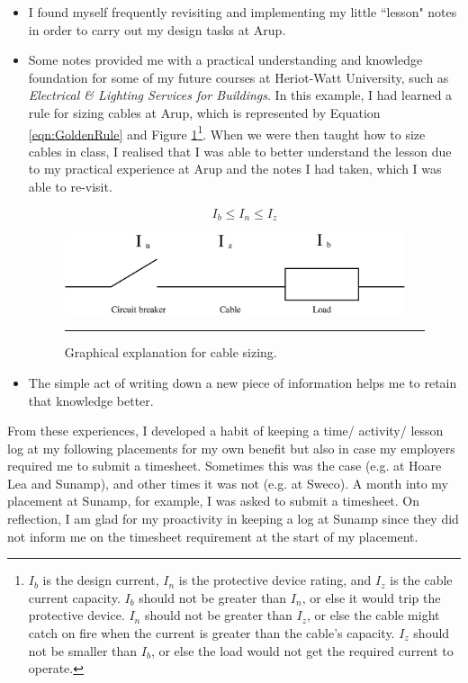 \begin{itemize}
	\item I found myself frequently revisiting and implementing my little ``lesson" notes in order to carry out my design tasks at Arup.
	\item Some notes provided me with a practical understanding and knowledge foundation for some of my future courses at Heriot-Watt University, such as \textit{Electrical \& Lighting Services for Buildings}.
	In this example, I had learned a rule for sizing cables at Arup, which is represented by Equation \ref{eqn:GoldenRule} and Figure \ref{fig:GoldenRule}\footnote{
		$I_b$ is the design current, $I_n$ is the protective device rating, and $I_z$ is the cable current capacity.
		$I_b$ should not be greater than $I_n$, or else it would trip the protective device.
		$I_n$ should not be greater than $I_z$, or else the cable might catch on fire when the current is greater than the cable's capacity.
		$I_z$ should not be smaller than $I_b$, or else the load would not get the required current to operate.
		}.
	When we were then taught how to size cables in class, I realised that I was able to better understand the lesson due to my practical experience at Arup and the notes I had taken, which I was able to re-visit.
	
	\begin{equation}
	I_b \leq I_n \leq I_z
	\label{eqn:GoldenRule}
	\end{equation}
	
	\begin{figure}[H]
		\centering
		\includegraphics[width=10cm]{figures/GoldenRule.eps}
		\rule{10cm}{0.5pt} %
		\caption{Graphical explanation for cable sizing.}
		\label{fig:GoldenRule}
	\end{figure}
	
	\item The simple act of writing down a new piece of information helps me to retain that knowledge better.
\end{itemize}



From these experiences, I developed a habit of keeping a time/ activity/ lesson log at my following placements for my own benefit but also in case my employers required me to submit a timesheet.
Sometimes this was the case (e.g. at Hoare Lea and Sunamp), and other times it was not (e.g. at Sweco).
A month into my placement at Sunamp, for example, I was asked to submit a timesheet.
On reflection, I am glad for my proactivity in keeping a log at Sunamp since they did not inform me on the timesheet requirement at the start of my placement.








